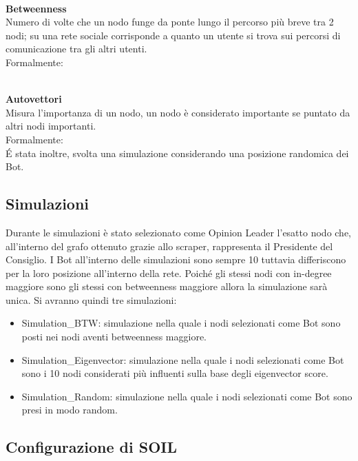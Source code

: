     \\
    \textbf{Betweenness}
    \\
    Numero di volte che un nodo funge da ponte lungo il percorso più breve tra 2 nodi; su una rete sociale corrisponde a quanto un utente si trova sui percorsi di comunicazione tra gli altri utenti.\\
    Formalmente:

    \\
    \textbf{Autovettori}
    \\
    Misura l'importanza di un nodo, un nodo è considerato importante se puntato da altri nodi importanti. \\
    Formalmente:
    \\
    É stata inoltre, svolta una simulazione considerando una posizione randomica dei Bot.

    \subsection{Simulazioni}
    Durante le simulazioni è stato selezionato come Opinion Leader l’esatto nodo che, all’interno del grafo ottenuto grazie allo scraper, rappresenta il Presidente del Consiglio. I Bot all’interno delle simulazioni sono sempre 10 tuttavia differiscono per la loro posizione all’interno della rete. Poiché gli stessi nodi con in-degree maggiore sono gli stessi con betweenness maggiore allora la simulazione sarà unica. Si avranno quindi tre simulazioni:
    \begin{itemize}
    \item Simulation_BTW: simulazione nella quale i nodi selezionati come Bot sono posti nei nodi aventi betweenness maggiore.
    \item Simulation_Eigenvector: simulazione nella quale i nodi selezionati come Bot sono i 10 nodi considerati più influenti sulla base degli eigenvector score.
    \item Simulation_Random: simulazione nella quale i nodi selezionati come Bot sono presi in modo random.
    \end{itemize}
    \subsection{Configurazione di SOIL}\label{ConfigSoil}

